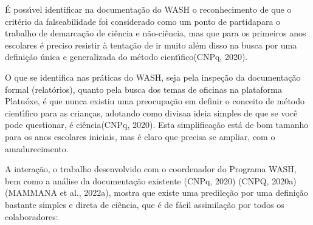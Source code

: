 \documentclass[
12pt,		%
openright,	%
twoside,  %
a4paper,			%
chapter=TITLE,		%
english,			%
french,				%
spanish,			%
brazil				%
]{USPSC-classe/USPSC}
\begin{document}
\noindent\begin{center}\mbox{\centering{}}\end{center}


\'E poss\'{\i}vel identificar na documenta\c{c}\~ao do WASH o reconhecimento de que o crit\'erio da falseabilidade foi considerado como um \textquotedbl ponto de partida\textquotedbl  para o trabalho de \textquotedbl demarca\c{c}\~ao de ci\^encia e n\~ao-ci\^encia\textquotedbl , mas que para \textquotedbl os primeiros anos escolares \'e preciso resistir \`a tenta\c{c}\~ao de ir muito al\'em disso na busca por uma defini\c{c}\~ao \'unica e generalizada do m\'etodo cient\'{\i}fico\textquotedbl   (CNPq, 2020).










O que se identifica nas pr\'aticas do WASH, seja pela inspe\c{c}\~ao da documenta\c{c}\~ao formal (relat\'orios), quanto pela busca dos temas de oficinas na plataforma \textquotedbl Platu\'oxe\textquotedbl , \'e que nunca existiu uma preocupa\c{c}\~ao em definir o conceito de m\'etodo cient\'{\i}fico para as crian\c{c}as, adotando como \textquotedbl divisa\textquotedbl  a ideia simples de que \textquotedbl se voc\^e pode questionar, \'e ci\^encia\textquotedbl   (CNPq, 2020). Esta simplifica\c{c}\~ao est\'a de bom tamanho para os anos escolares iniciais, mas \'e claro que precisa se ampliar, com o amadurecimento.










A intera\c{c}\~ao, o trabalho desenvolvido com o coordenador do Programa WASH, bem como a an\'alise da documenta\c{c}\~ao existente  (CNPq, 2020)  (CNPQ, 2020a)  (MAMMANA et al., 2022a), mostra que existe uma predile\c{c}\~ao por uma defini\c{c}\~ao bastante simples e direta de ci\^encia, que \'e de f\'acil assimila\c{c}\~ao por todos os colaboradores:
\end{document}
